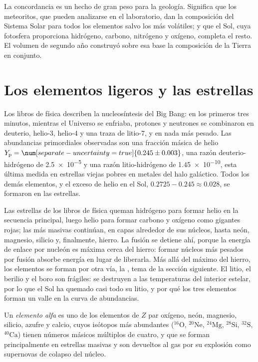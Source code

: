 La concordancia es un hecho de gran peso para la geología. Significa que los
meteoritos, que pueden analizarse en el laboratorio, dan la composición del
Sistema Solar para todos los elementos salvo los más volátiles; y que el Sol,
cuya fotosfera proporciona hidrógeno, carbono, nitrógeno y oxígeno, completa
el resto. El volumen de segundo año construyó sobre esa base la
composición de la Tierra en conjunto.

\section{Los elementos ligeros y las estrellas}\label{sec:b3:origin-of-elements:stars}

Los libros de física describen la nucleosíntesis del Big Bang: en los primeros tres
minutos, mientras el Universo se enfriaba, protones y neutrones se combinaron en
deuterio, helio-3, helio-4 y una traza de litio-7, y en nada
más pesado. Las abundancias primordiales observadas son una fracción másica de helio
$Y_\mathrm{p} = \num[separate-uncertainty=true]{0.245 \pm 0.003}$, una
razón deuterio-hidrógeno de \num{2.5e-5} y una razón litio-hidrógeno
de \num{1.45e-10}, esta última medida en estrellas viejas pobres en metales del
halo galáctico. Todos los demás elementos, y el exceso de helio en
el Sol, $0.2725 - 0.245 \approx 0.028$, se formaron en las estrellas.

Las estrellas de los libros de física queman hidrógeno para formar helio en la secuencia principal,
luego helio para formar carbono y oxígeno como gigantes rojas; las más
masivas continúan, en capas alrededor de sus núcleos, hasta neón, magnesio,
silicio y, finalmente, hierro. La fusión se detiene ahí, porque la energía de enlace
por nucleón es máxima cerca del hierro: formar núcleos más pesados por fusión
absorbe energía en lugar de liberarla. Más allá del máximo del hierro,
los elementos se forman por otra vía, la , tema
de la sección siguiente. El litio, el berilio y el boro son frágiles:
se destruyen a las temperaturas del interior estelar, por lo que el Sol
ha quemado casi todo su litio, y por qué los tres elementos
forman un valle en la curva de abundancias.

\begin{definition}\label{def:b3:origin-of-elements:alpha}
Un \emph{elemento alfa} es uno de los elementos de $Z$ par
oxígeno, neón, magnesio, silicio, azufre y calcio, cuyos
isótopos más abundantes ($^{16}\mathrm{O}$, $^{20}\mathrm{Ne}$,
$^{24}\mathrm{Mg}$, $^{28}\mathrm{Si}$, $^{32}\mathrm{S}$,
$^{40}\mathrm{Ca}$) tienen números másicos múltiplos de cuatro, y
que se forman principalmente en estrellas masivas y son devueltos al gas por su
explosión como supernovas de colapso del núcleo.
\end{definition}

